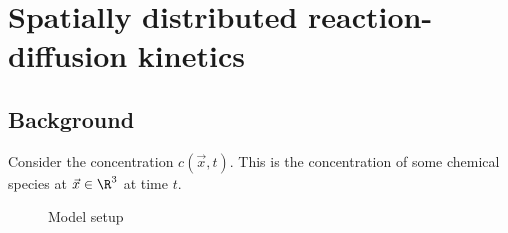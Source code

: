
\section{Spatially distributed reaction-diffusion kinetics}

\subsection{Background}
Consider the concentration $c(\vec x, t)$. This is the concentration of some chemical species at $\vec x \in \R^3$ at time $t$.\\
\begin{figure}[!ht]
\centering
\resizebox{0.3\textwidth}{!}{}
\caption{Model setup}
\end{figure}

